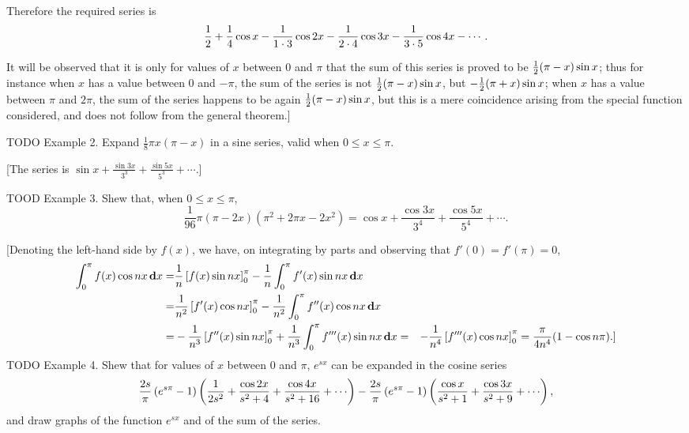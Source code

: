 Therefore the required series is
$$
\frac{1}{2}
+ \frac{1}{4} \cos x
- \frac{1}{1 \cdot 3} \cos 2x
- \frac{1}{2 \cdot 4} \cos 3x
- \frac{1}{3 \cdot 5} \cos 4x
- \cdots.
$$

It will be observed that it is only for values of $x$ between
$0$ and $\pi$ that the sum of this series is proved to be
$\frac{1}{2} (\pi - x) \sin x$; thus for
instance when $x$ has a value between $0$ and $-\pi$,
the sum of the series is not
$\frac{1}{2} (\pi - x) \sin x$, but $-\frac{1}{2} (\pi + x) \sin x$; when $x$ has a value
between $\pi$ and $2 \pi$, the sum of the series happens to be again
$\frac{1}{2} (\pi - x) \sin x$, but this is a mere coincidence arising from the special
function considered, and does not follow from the general theorem.]

TODO Example 2. Expand $\frac{1}{8} \pi x (\pi - x)$ in a sine series,
valid when $0 \leq x \leq \pi$.

[The series is $\sin x + \frac{\sin 3x}{3^{3}} + \frac{\sin 5x}{5^{3}} + \cdots.$]
%
%

TOOD Example 3. Shew that, when $0 \leq x \leq \pi$,
$$
\frac{1}{96}
\pi
(\pi - 2x)
(\pi^{2} + 2 \pi x - 2 x^{2})
=
\cos x
+ \frac{\cos 3x}{3^{4}}
+ \frac{\cos 5x}{5^{4}}
+ \cdots.
$$

[Denoting the left-hand side by $f(x)$, we have, on integrating by
parts and observing that $f'(0) = f'(\pi) = 0$,
\begin{align*}
  \int_{0}^{\pi} f(x) \cos nx \, \mathbf{d} x
  =&
  \frac{1}{n} \left[ f(x) \sin nx \right]_{0}^{\pi}
  -
  \frac{1}{n} \int_{0}^{\pi} f'(x) \sin nx \, \mathbf{d} x
  \\
  =&
  \frac{1}{n^{2}} \left[ f'(x) \cos nx \right]_{0}^{\pi}
  -
  \frac{1}{n^{2}} \int_{0}^{\pi} f''(x) \cos nx \, \mathbf{d} x
  \\
  =&
  -\frac{1}{n^{3}} \left[ f''(x) \sin nx \right]_{0}^{\pi}
  +
  \frac{1}{n^{3}} \int_{0}^{\pi} f'''(x) \sin nx \, \mathbf{d} x
  =&
  -\frac{1}{n^{4}} \left[ f'''(x) \cos nx \right]_{0}^{\pi}
  =
  \frac{\pi}{4 n^{4}} (1 - \cos n \pi).]
\end{align*}
TODO Example 4. Shew that for values of $x$ between $0$ and $\pi$,
$e^{s x}$ can be expanded in the cosine series
$$
\frac{2 s}{\pi}
\theparen{e^{s \pi} - 1}
\theparen{
  \frac{1}{2 s^{2}}
  + \frac{\cos 2x}{s^{2} + 4}
  + \frac{\cos 4x}{s^{2} + 16}
  + \cdots
}
-
\frac{2 s}{\pi}
\theparen{e^{s \pi} - 1}
\theparen{
  \frac{\cos x}{s^{2} + 1}
  + \frac{\cos 3x}{s^{2} + 9}
  + \cdots
},
$$
and draw graphs of the function $e^{s x}$ and of the sum of the series.

